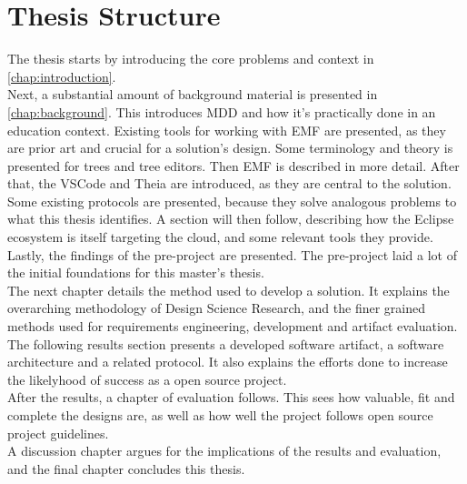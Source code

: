 \section{Thesis Structure}

The thesis starts by introducing the core problems and context in \cref{chap:introduction}.\\

Next, a substantial amount of background material is presented in \cref{chap:background}.
This introduces \acrlong{MDD} and how it's practically done in an education context.
Existing tools for working with \acrshort{EMF} are presented, as they are prior art and crucial for a solution's design.
Some terminology and theory is presented for trees and tree editors.
Then \acrshort{EMF} is described in more detail.
After that, the \gls{VSCode} and \gls{Theia}  are introduced, as they are central to the solution.
Some existing protocols are presented, because they solve analogous problems to what this thesis identifies.
A section will then follow, describing how the Eclipse ecosystem is itself targeting the \gls{cloud}, and some relevant tools they provide.
Lastly, the findings of the pre-project are presented.
The pre-project laid a lot of the initial foundations for this master's thesis.\\

The next chapter details the method used to develop a solution.
It explains the overarching methodology of Design Science Research, and the finer grained methods used for requirements engineering, development and artifact evaluation.\\

The following results section presents a developed software artifact, a software architecture and a related protocol.
It also explains the efforts done to increase the likelyhood of success as a \gls{open source} project.\\

After the results, a chapter of evaluation follows.
This sees how valuable, fit and complete the designs are, as well as how well the project follows \gls{open source} project guidelines.\\

A discussion chapter argues for the implications of the results and evaluation,
and the final chapter concludes this thesis.